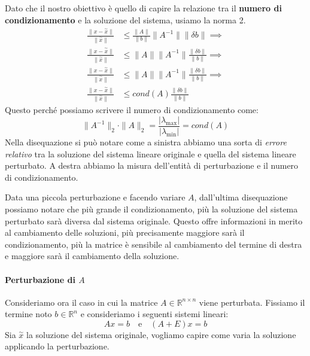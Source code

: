Dato che il nostro obiettivo è quello di capire la relazione tra il \textbf{numero
    di condizionamento} e la soluzione del sistema, usiamo la norma 2.
\begin{equation}
    \begin{aligned}
        \frac{\|x - \stackrel{\sim}{x} \|}{\|\stackrel{\sim}{x}\|} & \leq \frac{\|A\|}{\|b\|} \|A^{-1}\|\|\delta b\| \implies \\
        \frac{\|x - \stackrel{\sim}{x} \|}{\|\stackrel{\sim}{x}\|} & \leq \|A\| \|A^{-1}\|\frac{\|\delta b\|}{\|b\|} \implies \\
        \frac{\|x - \stackrel{\sim}{x} \|}{\|\stackrel{\sim}{x}\|} & \leq \|A\| \|A^{-1}\|\frac{\|\delta b\|}{\|b\|} \implies \\
        \frac{\|x - \stackrel{\sim}{x} \|}{\|\stackrel{\sim}{x}\|} & \leq  cond(A)\frac{\|\delta b\|}{\|b\|}
    \end{aligned}
\end{equation}
Questo perché possiamo scrivere il numero di condizionamento come:
\begin{equation*}
    \|A^{-1}\|_2\cdot \|A\|_2 = \frac{|\lambda_{\max}|}{|\lambda_{\min}|} = cond(A)
\end{equation*}
Nella disequazione si può notare come a sinistra abbiamo una sorta di \textit{errore
    relativo} tra la soluzione del sistema lineare originale e quella del sistema
lineare perturbato. A destra abbiamo la misura dell'entità di perturbazione e il
numero di condizionamento.

Data una piccola perturbazione e facendo variare $A$, dall'ultima disequazione
possiamo notare che più grande il condizionamento, più la soluzione del sistema
perturbato sarà diversa dal sistema originale. Questo offre informazioni in merito
al cambiamento delle soluzioni, più precisamente maggiore sarà il condizionamento,
più la matrice è sensibile al cambiamento del termine di destra e maggiore
sarà il cambiamento della soluzione.
\paragraph{Perturbazione di $A$}
Consideriamo ora il caso in cui la matrice $A \in \mathbb{R}^{n \times n}$ viene
perturbata. Fissiamo il termine noto $b \in \mathbb{R}^n$ e consideriamo i seguenti
sistemi lineari:
\begin{equation*}
    Ax = b \quad \text{e} \quad (A + E)x = b
\end{equation*}
Sia $\stackrel{\sim}{x}$ la soluzione del sistema originale, vogliamo capire come
varia la soluzione applicando la perturbazione.


